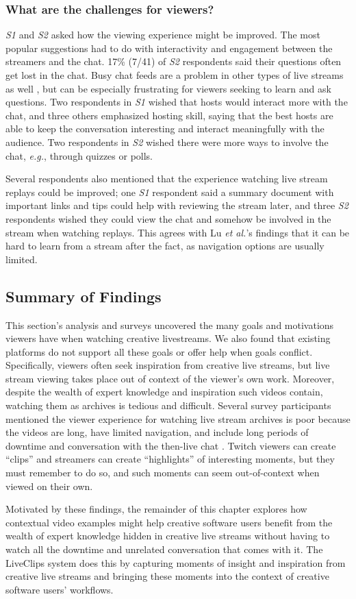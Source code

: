 \subsubsection{What are the challenges for viewers?}
\textit{S1} and \textit{S2} asked how the viewing experience might be improved. The most popular suggestions had to do with interactivity and engagement between the streamers and the chat. 17\% (7/41) of \textit{S2} respondents said their questions often get lost in the chat. Busy chat feeds are a problem in other types of live streams as well \cite{Miller2017}, but can be especially frustrating for viewers seeking to learn and ask questions. Two respondents in \textit{S1} wished that hosts would interact more with the chat, and three others emphasized hosting skill, saying that the best hosts are able to keep the conversation interesting and interact meaningfully with the audience. Two respondents in \textit{S2} wished there were more ways to involve the chat, \textit{e.g.}, through quizzes or polls. 

Several respondents also mentioned that the experience watching live stream replays could be improved; one \textit{S1} respondent said a summary document with important links and tips could help with reviewing the stream later, and three \textit{S2} respondents wished they could view the chat and somehow be involved in the stream when watching replays. This agrees with Lu \textit{et al.}'s findings \cite{Lu2018} that it can be hard to learn from a stream after the fact, as navigation options are usually limited.

\subsection{Summary of Findings}
This section's analysis and surveys uncovered the many goals and motivations viewers have when watching creative live\-streams. We also found that existing platforms do not support all these goals or offer help when goals conflict. Specifically, viewers often seek inspiration from creative live streams, but live stream viewing takes place out of context of the viewer's own work. Moreover, despite the wealth of expert knowledge and inspiration such videos contain, watching them as archives is tedious and difficult. Several survey participants mentioned the viewer experience for watching live stream archives is poor because the videos are long, have limited navigation, and include long periods of downtime and conversation with the then-live chat \cite{Lu2018}. Twitch viewers can create ``clips'' and streamers can create ``highlights'' of interesting moments, but they must remember to do so, and such moments can seem out-of-context when viewed on their own.

Motivated by these findings, the remainder of this chapter explores how contextual video examples might help creative software users benefit from the wealth of expert knowledge hidden in creative live streams without having to watch all the downtime and unrelated conversation that comes with it. The LiveClips system does this by capturing moments of insight and inspiration from creative live streams and bringing these moments into the context of creative software users' workflows.